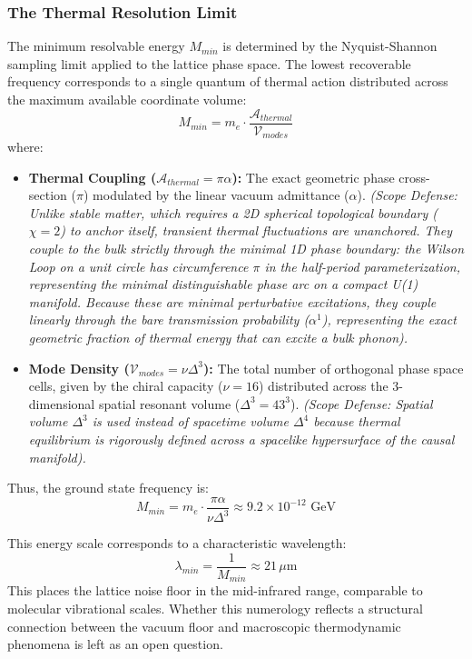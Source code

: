 \subsubsection{The Thermal Resolution Limit}
The minimum resolvable energy $M_{min}$ is determined by the Nyquist-Shannon sampling limit applied to the lattice phase space. The lowest recoverable frequency corresponds to a single quantum of thermal action distributed across the maximum available coordinate volume:
\begin{equation}
    M_{min} = m_e \cdot \frac{\mathcal{A}_{thermal}}{\mathcal{V}_{modes}}
\end{equation}
where:
\begin{itemize}
    \item \textbf{Thermal Coupling ($\mathcal{A}_{thermal} = \pi\alpha$):} The exact geometric phase cross-section ($\pi$) modulated by the linear vacuum admittance ($\alpha$). \textit{(Scope Defense: Unlike stable matter, which requires a 2D spherical topological boundary ($\chi=2$) to anchor itself, transient thermal fluctuations are unanchored. They couple to the bulk strictly through the minimal 1D phase boundary: the Wilson Loop on a unit circle has circumference $\pi$ in the half-period parameterization, representing the minimal distinguishable phase arc on a compact U(1) manifold. Because these are minimal perturbative excitations, they couple linearly through the bare transmission probability ($\alpha^1$), representing the exact geometric fraction of thermal energy that can excite a bulk phonon).}
    \item \textbf{Mode Density ($\mathcal{V}_{modes} = \nu\Delta^3$):} The total number of orthogonal phase space cells, given by the chiral capacity ($\nu=16$) distributed across the 3-dimensional spatial resonant volume ($\Delta^3 = 43^3$). \textit{(Scope Defense: Spatial volume $\Delta^3$ is used instead of spacetime volume $\Delta^4$ because thermal equilibrium is rigorously defined across a spacelike hypersurface of the causal manifold).}
\end{itemize}

Thus, the ground state frequency is:
\begin{equation}
    M_{min} = m_e \cdot \frac{\pi\alpha}{\nu\Delta^3} 
    \approx 9.2 \times 10^{-12} \text{ GeV}
\end{equation}

This energy scale corresponds to a characteristic wavelength:
\begin{equation}
    \lambda_{min} = \frac{1}{M_{min}} \approx 21 \, \mu\text{m}
\end{equation}
This places the lattice noise floor in the mid-infrared range, comparable to molecular vibrational scales. Whether this numerology reflects a structural connection between the vacuum floor and macroscopic thermodynamic phenomena is left as an open question.

